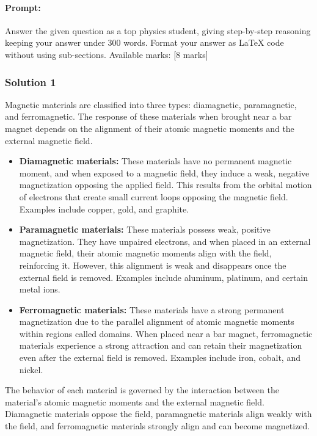 \documentclass{article}
\begin{document}
\paragraph{Prompt: \\} 
Answer the given question as a top physics student, giving step-by-step reasoning keeping your answer under 300 words. Format your answer as LaTeX code without using sub-sections. Available marks: [8 marks]

\subsubsection{Solution 1}

Magnetic materials are classified into three types: diamagnetic, paramagnetic, and ferromagnetic. The response of these materials when brought near a bar magnet depends on the alignment of their atomic magnetic moments and the external magnetic field.

\begin{itemize}
    \item \textbf{Diamagnetic materials:} These materials have no permanent magnetic moment, and when exposed to a magnetic field, they induce a weak, negative magnetization opposing the applied field. This results from the orbital motion of electrons that create small current loops opposing the magnetic field. Examples include copper, gold, and graphite.
    \item \textbf{Paramagnetic materials:} These materials possess weak, positive magnetization. They have unpaired electrons, and when placed in an external magnetic field, their atomic magnetic moments align with the field, reinforcing it. However, this alignment is weak and disappears once the external field is removed. Examples include aluminum, platinum, and certain metal ions.
    \item \textbf{Ferromagnetic materials:} These materials have a strong permanent magnetization due to the parallel alignment of atomic magnetic moments within regions called domains. When placed near a bar magnet, ferromagnetic materials experience a strong attraction and can retain their magnetization even after the external field is removed. Examples include iron, cobalt, and nickel.
\end{itemize}

The behavior of each material is governed by the interaction between the material's atomic magnetic moments and the external magnetic field. Diamagnetic materials oppose the field, paramagnetic materials align weakly with the field, and ferromagnetic materials strongly align and can become magnetized.
\end{document}
